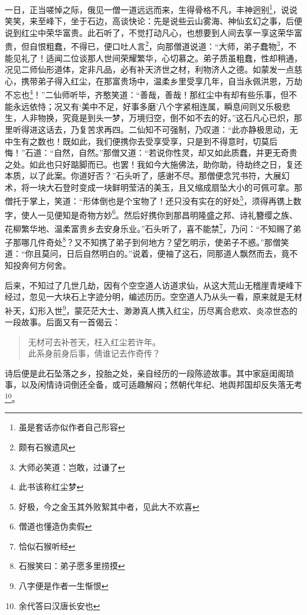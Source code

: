 \documentclass[12pt,oneside]{book}
\newenvironment{shici}{%
\begin{verse}%
\centering\large\hspace{12pt}}%
{\end{verse}}
\begin{document}
一日，正当嗟悼之际，俄见一僧一道远远而来，生得骨格不凡，丰神迥别\footnote{虽是套话亦似作者自己形容}，说说笑笑，来至峰下，坐于石边，高谈快论：先是说些云山雾海、神仙玄幻之事，后便说到红尘中荣华富贵。此石听了，不觉打动凡心，也想要到人间去享一享这荣华富贵，但自恨粗蠢，不得已，便口吐人言\footnote{颇有石猴遗风}，向那僧道说道：“大师，弟子蠢物\footnote{大师必笑道：岂敢，过谦了}，不能见礼了！适闻二位谈那人世间荣耀繁华，心切慕之。弟子质虽粗蠢，性却稍通，况见二师仙形道体，定非凡品，必有补天济世之材，利物济人之德。如蒙发一点慈心，携带弟子得入红尘，在那富贵场中，温柔乡里受享几年，自当永佩洪恩，万劫不忘也\footnote{此书该称红尘梦}！”二仙师听毕，齐憨笑道：“善哉，善哉！那红尘中有却有些乐事，但不能永远依恃；况又有‘美中不足，好事多磨’八个字紧相连属，瞬息间则又乐极悲生，人非物换，究竟是到头一梦，万境归空，倒不如不去的好。”这石凡心已炽，那里听得进这话去，乃复苦求再四。二仙知不可强制，乃叹道：“此亦静极思动，无中生有之数也！既如此，我们便携你去受享受享，只是到不得意时，切莫后悔！”石道：“自然，自然。”那僧又道：“若说你性灵，却又如此质蠢，并更无奇贵之处。如此也只好踮脚而已。也罢！我如今大施佛法，助你助，待劫终之日，复还本质，以了此案。你道好否？”石头听了，感谢不尽。那僧便念咒书符，大展幻术，将一块大石登时变成一块鲜明莹洁的美玉，且又缩成扇坠大小的可佩可拿。那僧托于掌上，笑道：“形体倒也是个宝物了！还只没有实在的好处\footnote{好极，今之金玉其外败絮其中者，见此大不欢喜}，须得再镌上数字，使人一见便知是奇物方妙\footnote{僧道也懂造伪卖假}。然后好携你到那昌明隆盛之邦、诗礼簪缨之族、花柳繁华地、温柔富贵乡去安身乐业。”石头听了，喜不能禁\footnote{恰似石猴听经}，乃问：“不知赐了弟子那哪几件奇处\footnote{石猴笑曰：弟子愿多里捞摸}？又不知携了弟子到何地方？望乞明示，使弟子不惑。”那僧笑道：“你且莫问，日后自然明白的。”说着，便袖了这石，同那道人飘然而去，竟不知投奔何方何舍。

后来，不知过了几世几劫，因有个空空道人访道求仙，从这大荒山无稽崖青埂峰下经过，忽见一大块石上字迹分明，编述历历。空空道人乃从头一看，原来就是无材补天，幻形入世\footnote{八字便是作者一生惭恨}，蒙茫茫大士、渺渺真人携入红尘，历尽离合悲欢、炎凉世态的一段故事。后面又有一首偈云：


\begin{shici}
无材可去补苍天，枉入红尘若许年。\\
此系身前身后事，倩谁记去作奇传？
\end{shici}

诗后便是此石坠落之乡，投胎之处，亲自经历的一段陈迹故事。其中家庭闺阁琐事，以及闲情诗词倒还全备，或可适趣解闷；然朝代年纪、地舆邦国却反失落无考\footnote{余代答曰汉唐长安也}。
\end{document}
